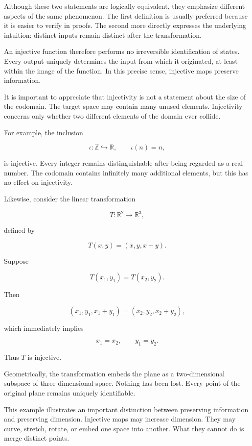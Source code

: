 \documentclass[11pt]{book}
\numberwithin{equation}{chapter}
\theoremstyle{definition}
\theoremstyle{plain}
\theoremstyle{remark}
\begin{document}
Although these two statements are logically equivalent, they emphasize different aspects of the same phenomenon. The first definition is usually preferred because it is easier to verify in proofs. The second more directly expresses the underlying intuition: distinct inputs remain distinct after the transformation.

An injective function therefore performs no irreversible identification of states. Every output uniquely determines the input from which it originated, at least within the image of the function. In this precise sense, injective maps preserve information.

It is important to appreciate that injectivity is not a statement about the size of the codomain. The target space may contain many unused elements. Injectivity concerns only whether two different elements of the domain ever collide.

For example, the inclusion

\[
\iota:\mathbb{Z}\hookrightarrow\mathbb{R},
\qquad
\iota(n)=n,
\]

is injective. Every integer remains distinguishable after being regarded as a real number. The codomain contains infinitely many additional elements, but this has no effect on injectivity.

Likewise, consider the linear transformation

\[
T:\mathbb{R}^{2}\rightarrow\mathbb{R}^{3},
\]

defined by

\[
T(x,y)=(x,y,x+y).
\]

Suppose

\[
T(x_1,y_1)=T(x_2,y_2).
\]

Then

\[
(x_1,y_1,x_1+y_1)
=
(x_2,y_2,x_2+y_2),
\]

which immediately implies

\[
x_1=x_2,
\qquad
y_1=y_2.
\]

Thus \(T\) is injective.

Geometrically, the transformation embeds the plane as a two-dimensional subspace of three-dimensional space. Nothing has been lost. Every point of the original plane remains uniquely identifiable.

This example illustrates an important distinction between preserving information and preserving dimension. Injective maps may increase dimension. They may curve, stretch, rotate, or embed one space into another. What they cannot do is merge distinct points.
\end{document}
